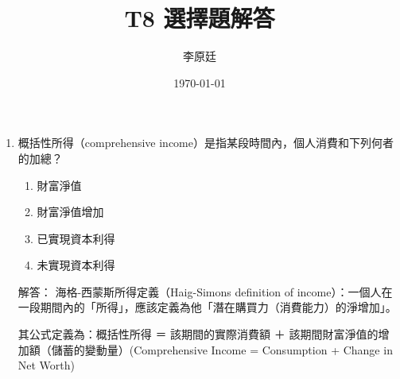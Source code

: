 \documentclass[12pt, a4paper]{article}
\begin{document}
\title{T8 選擇題解答} %
\author{李原廷} %
\date{\today} %

\maketitle

\begin{enumerate}

    \item 概括性所得（comprehensive income）是指某段時間內，個人消費和下列何者的加總？
    \begin{enumerate}[label=\Alph*.]
        \item 財富淨值
        \item 財富淨值增加
        \item 已實現資本利得
        \item 未實現資本利得
    \end{enumerate}
    解答：
    海格-西蒙斯所得定義（Haig-Simons definition of income）：一個人在一段期間內的「所得」，應該定義為他「潛在購買力（消費能力）的淨增加」。

    其公式定義為：概括性所得 ＝ 該期間的實際消費額 ＋ 該期間財富淨值的增加額（儲蓄的變動量）(Comprehensive Income = Consumption + Change in Net Worth)


\end{enumerate}
\end{document}
